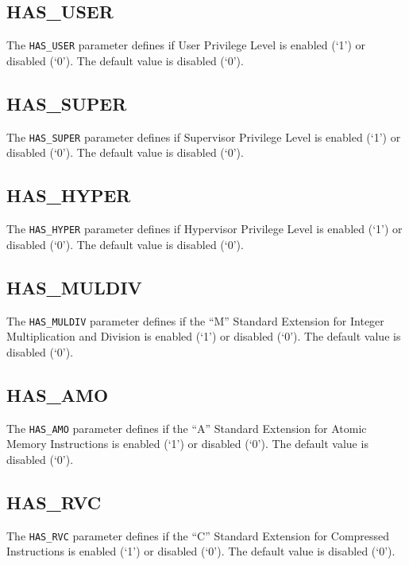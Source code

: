 \subsection{HAS\_USER}\label{has_user}

The \texttt{HAS\_USER} parameter defines if User Privilege Level is enabled (`1')
or disabled (`0'). The default value is disabled (`0').

\subsection{HAS\_SUPER}\label{has_super}

The \texttt{HAS\_SUPER} parameter defines if Supervisor Privilege Level is
enabled (`1') or disabled (`0'). The default value is disabled (`0').

\subsection{HAS\_HYPER}\label{has_hyper}

The \texttt{HAS\_HYPER} parameter defines if Hypervisor Privilege Level is
enabled (`1') or disabled (`0'). The default value is disabled (`0').

\subsection{HAS\_MULDIV}\label{has_muldiv}

The \texttt{HAS\_MULDIV} parameter defines if the ``M'' Standard Extension for
Integer Multiplication and Division is enabled (`1') or disabled (`0').
The default value is disabled (`0').

\subsection{HAS\_AMO}\label{has_amo}

The \texttt{HAS\_AMO} parameter defines if the ``A'' Standard Extension for
Atomic Memory Instructions is enabled (`1') or disabled (`0'). The
default value is disabled (`0').

\subsection{HAS\_RVC}\label{has_rvc}

The \texttt{HAS\_RVC} parameter defines if the ``C'' Standard Extension for
Compressed Instructions is enabled (`1') or disabled (`0'). The default
value is disabled (`0').

